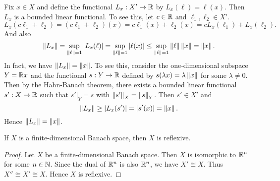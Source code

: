 \begin{example}
    Fix $x\in X$ and define the functional $L_x:X'\to\mathbb{R}$ by 
    $L_x(\ell) = \ell(x)$. Then $L_x$ is a bounded linear functional. 
    To see this, let $c\in\mathbb{R}$ and $\ell_1,\ell_2\in X'$. 
    \begin{equation*}
        L_x(c\ell_1 + \ell_2) = (c\ell_1 + \ell_2)(x) = c\ell_1(x) + \ell_2(x) 
        = cL_x(\ell_1) + L_x(\ell_2).
    \end{equation*} 
    And also
    \begin{equation*}
        \left\lVert {L_x} \right\rVert = \sup_{\left\lVert {\ell} \right\rVert=1}\left\lvert {L_x(\ell)} \right\rvert 
        = \sup_{\left\lVert {\ell} \right\rVert=1}\left\lvert {\ell(x)} \right\rvert \leq \sup_{\left\lVert {\ell} \right\rVert=1}\left\lVert {\ell} \right\rVert\left\lVert {x} \right\rVert 
        = \left\lVert {x} \right\rVert.
    \end{equation*}
    In fact, we have $\left\lVert {L_x} \right\rVert = \left\lVert {x} \right\rVert$. To see this, consider 
    the one-dimensional subspace $Y = \mathbb{R} x$ and the functional 
    $s:Y\to\mathbb{R}$ defined by $s(\lambda x) = \lambda\left\lVert {x} \right\rVert$ for some 
    $\lambda\neq 0$. Then by the Hahn-Banach theorem, there exists a 
    bounded linear functional $s':X\to\mathbb{R}$ such that $s'|_Y = s$ with 
    $\left\lVert {s'} \right\rVert_X = \left\lVert {s} \right\rVert_Y$. Then $s'\in X'$ and 
    \begin{equation*}
        \left\lVert {L_x} \right\rVert \geq \left\lvert {L_x(s')} \right\rvert = \left\lvert {s'(x)} \right\rvert = \left\lVert {x} \right\rVert.
    \end{equation*} 
    Hence $\left\lVert {L_x} \right\rVert = \left\lVert {x} \right\rVert$. 
\end{example}

\begin{proposition}
    If $X$ is a finite-dimensional Banach space, then $X$ is reflexive.
\end{proposition}
\begin{proof}
    Let $X$ be a finite-dimensional Banach space. Then $X$ is 
    isomorphic to $\mathbb{R}^n$ for some $n\in\mathbb{N}$. Since the dual of 
    $\mathbb{R}^n$ is also $\mathbb{R}^n$, we have $X'\cong X$. Thus $X''\cong X'\cong X$. 
    Hence $X$ is reflexive.
\end{proof}

